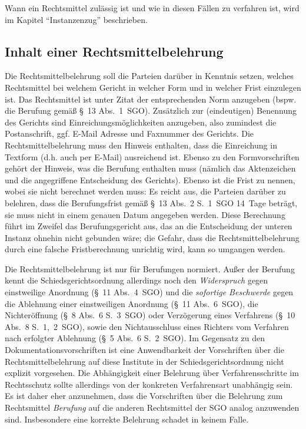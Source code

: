 Wann ein Rechtsmittel zulässig ist und wie in diesen Fällen zu verfahren ist, wird im Kapitel \enquote{Instanzenzug} beschrieben.

\subsection{Inhalt einer Rechtsmittelbelehrung}
Die Rechtsmittelbelehrung soll die Parteien darüber in Kenntnis setzen, welches Rechtsmittel bei welchem Gericht in welcher Form und in welcher Frist einzulegen ist. Das Rechtsmittel ist unter Zitat der entsprechenden Norm anzugeben (bspw. die Berufung gemäß \S~13 Abs.~1~SGO). Zusätzlich zur (eindeutigen) Benennung des Gerichts sind Einreichungsmöglichkeiten anzugeben, also zumindest die Postanschrift, ggf. E-Mail Adresse und Faxnummer des Gerichts. Die Rechtsmittelbelehrung muss den Hinweis enthalten, dass die Einreichung in Textform (d.h. auch per E-Mail) ausreichend ist. Ebenso zu den Formvorschriften gehört der Hinweis, was die Berufung enthalten muss (nämlich das Aktenzeichen und die angegriffene Entscheidung des Gerichts). Ebenso ist die Frist zu nennen, wobei sie nicht berechnet werden muss: Es reicht aus, die Parteien darüber zu belehren, dass die Berufungsfrist gemäß \S~13 Abs.~2 S.~1~SGO 14~Tage beträgt, sie muss nicht in einem genauen Datum angegeben werden. Diese Berechnung führt im Zweifel das Berufungsgericht aus, das an die Entscheidung der unteren Instanz ohnehin nicht gebunden wäre; die Gefahr, dass die Rechtsmittelbelehrung durch eine falsche Fristberechnung unrichtig wird, kann so umgangen werden.

Die Rechtsmittelbelehrung ist nur für Berufungen normiert. Außer der Berufung kennt die Schiedsgerichtsordnung allerdings noch den \emph{Widerspruch} gegen einstweilige Anordnung (\S~11 Abs.~4~SGO) und die \emph{sofortige Beschwerde} gegen die Ablehnung einer einstweiligen Anordnung (\S~11 Abs.~6~SGO), die Nichteröffnung (\S~8 Abs.~6 S.~3~SGO) oder Verzögerung eines Verfahrens (\S~10 Abs.~8 S.~1,~2~SGO), sowie den Nichtausschluss eines Richters vom Verfahren nach erfolgter Ablehnung (\S~5 Abs.~6 S.~2~SGO). Im Gegensatz zu den Dokumentationsvorschriften ist eine Anwendbarkeit der Vorschriften über die Rechtsmittelbelehrung auf diese Institute in der Schiedsgerichtsordnung nicht explizit vorgesehen. Die Abhängigkeit einer Belehrung über Verfahrensschritte im Rechtsschutz sollte allerdings von der konkreten Verfahrensart unabhängig sein. Es ist daher eher anzunehmen, dass die Vorschriften über die Belehrung zum Rechtsmittel \emph{Berufung} auf die anderen Rechtsmittel der SGO analog anzuwenden sind. Insbesondere eine korrekte Belehrung schadet in keinem Falle.

